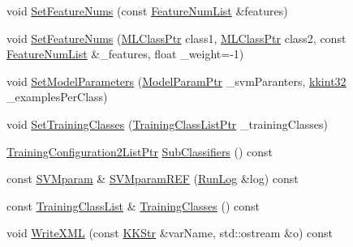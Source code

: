 \begin{DoxyCompactItemize}
\item 
void \hyperlink{class_k_k_m_l_l_1_1_training_configuration2_aa1ab3e038551bdf6d0b0e357744d374e}{Set\+Feature\+Nums} (const \hyperlink{class_k_k_m_l_l_1_1_feature_num_list}{Feature\+Num\+List} \&features)
\item 
void \hyperlink{class_k_k_m_l_l_1_1_training_configuration2_ad191819913238818fc4d6cc48a69c436}{Set\+Feature\+Nums} (\hyperlink{namespace_k_k_m_l_l_ac272393853d59e72e8456f14cd6d8c23}{M\+L\+Class\+Ptr} class1, \hyperlink{namespace_k_k_m_l_l_ac272393853d59e72e8456f14cd6d8c23}{M\+L\+Class\+Ptr} class2, const \hyperlink{class_k_k_m_l_l_1_1_feature_num_list}{Feature\+Num\+List} \&\+\_\+features, float \+\_\+weight=-\/1)
\item 
void \hyperlink{class_k_k_m_l_l_1_1_training_configuration2_a6a856056c226cb5b9dfc305160ec26b7}{Set\+Model\+Parameters} (\hyperlink{namespace_k_k_m_l_l_a76c2dec3304f1a2dc2e357872e4fb320}{Model\+Param\+Ptr} \+\_\+svm\+Paranters, \hyperlink{namespace_k_k_b_a8fa4952cc84fda1de4bec1fbdd8d5b1b}{kkint32} \+\_\+examples\+Per\+Class)
\item 
void \hyperlink{class_k_k_m_l_l_1_1_training_configuration2_a3010d386528b3e464594d1e4a75ae2ce}{Set\+Training\+Classes} (\hyperlink{namespace_k_k_m_l_l_a21446a7d0151cdc0e5401d0ca6b269bc}{Training\+Class\+List\+Ptr} \+\_\+training\+Classes)
\item 
\hyperlink{namespace_k_k_m_l_l_a77bfbdd70b510fed053cec865434ba28}{Training\+Configuration2\+List\+Ptr} \hyperlink{class_k_k_m_l_l_1_1_training_configuration2_a7f3fcbacec897010722a5223c46dec5d}{Sub\+Classifiers} () const 
\item 
const \hyperlink{class_k_k_m_l_l_1_1_s_v_mparam}{S\+V\+Mparam} \& \hyperlink{class_k_k_m_l_l_1_1_training_configuration2_a46ee760ae3f4f785ec108e7dc0705d4f}{S\+V\+Mparam\+R\+EF} (\hyperlink{class_k_k_b_1_1_run_log}{Run\+Log} \&log) const 
\item 
const \hyperlink{class_k_k_m_l_l_1_1_training_class_list}{Training\+Class\+List} \& \hyperlink{class_k_k_m_l_l_1_1_training_configuration2_a450845cc4aaf5e9e88fb60bdd6a528bf}{Training\+Classes} () const 
\item 
void \hyperlink{class_k_k_m_l_l_1_1_training_configuration2_a72506f9e9d0fea4b855d4ffc101ab5ba}{Write\+X\+ML} (const \hyperlink{class_k_k_b_1_1_k_k_str}{K\+K\+Str} \&var\+Name, std\+::ostream \&o) const 
\end{DoxyCompactItemize}
